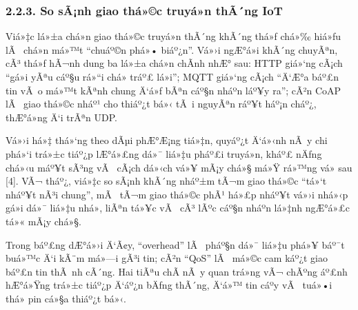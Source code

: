 \documentclass[a4paper]{extarticle}
\begin{document}
\subsubsection{2.2.3. So sÃ¡nh giao thá»©c truyá»n thÃ´ng
IoT}\label{223-so-suxe1nh-giao-thux1ee9c-truyux1ec1n-thuxf4ng-iot}

Viá»‡c lá»±a chá»n giao thá»©c truyá»n thÃ´ng khÃ´ng thá»ƒ chá»‰ hiá»ƒu lÃ  chá»n má»™t
``chuáº©n phá»• biáº¿n''. Vá»›i ngÆ°á»i khÃ´ng chuyÃªn, cÃ³ thá»ƒ hÃ¬nh dung ba lá»±a chá»n
chÃ­nh nhÆ° sau: HTTP giá»‘ng cÃ¡ch ``gá»­i yÃªu cáº§u rá»“i chá» tráº£ lá»i''; MQTT
giá»‘ng cÃ¡ch ``Ä‘Æ°a báº£n tin vÃ o má»™t kÃªnh chung Ä‘á»ƒ bÃªn cáº§n nháº­n láº¥y ra'';
cÃ²n CoAP lÃ  giao thá»©c nháº¹ cho thiáº¿t bá»‹ tÃ i nguyÃªn ráº¥t háº¡n cháº¿,
thÆ°á»ng Ä‘i trÃªn UDP.

Vá»›i há»‡ thá»‘ng theo dÃµi phÆ°Æ¡ng tiá»‡n, quyáº¿t Ä‘á»‹nh nÃ y chi phá»‘i trá»±c tiáº¿p
lÆ°á»£ng dá»¯ liá»‡u pháº£i truyá»n, kháº£ nÄƒng chá»‹u máº¥t sÃ³ng vÃ  cÃ¡ch dá»‹ch vá»¥ mÃ¡y
chá»§ má»Ÿ rá»™ng vá» sau {[}4{]}. VÃ¬ tháº¿, viá»‡c so sÃ¡nh khÃ´ng nháº±m tÃ¬m giao
thá»©c ``tá»‘t nháº¥t nÃ³i chung'', mÃ  tÃ¬m giao thá»©c phÃ¹ há»£p nháº¥t vá»›i nhá»‹p gá»­i
dá»¯ liá»‡u nhá», liÃªn tá»¥c vÃ  cÃ³ lÃºc cáº§n nháº­n lá»‡nh ngÆ°á»£c tá»« mÃ¡y chá»§.

Trong báº£ng dÆ°á»›i Ä‘Ã¢y, ``overhead'' lÃ  pháº§n dá»¯ liá»‡u phá»¥ báº¯t buá»™c Ä‘i kÃ¨m
má»—i gÃ³i tin; cÃ²n ``QoS'' lÃ  má»©c cam káº¿t giao báº£n tin thÃ nh cÃ´ng. Hai
tiÃªu chÃ­ nÃ y quan trá»ng vÃ¬ chÃºng áº£nh hÆ°á»Ÿng trá»±c tiáº¿p Ä‘áº¿n bÄƒng thÃ´ng, Ä‘á»™
tin cáº­y vÃ  tuá»•i thá» pin cá»§a thiáº¿t bá»‹.
\end{document}
